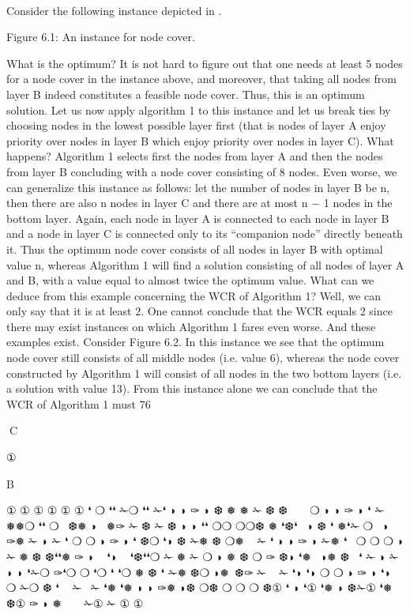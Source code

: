 \paragraph{}
Consider the following instance depicted in .

Figure 6.1: An instance for node cover.

What is the optimum? It is not hard to figure out that one needs at least 5 nodes for a node cover in
the instance above, and moreover, that taking all nodes from layer B indeed constitutes a feasible node
cover. Thus, this is an optimum solution. Let us now apply algorithm 1 to this instance and let us break
ties by choosing nodes in the lowest possible layer first (that is nodes of layer A enjoy priority over nodes
in layer B which enjoy priority over nodes in layer C). What happens? Algorithm 1 selects first the nodes
from layer A and then the nodes from layer B concluding with a node cover consisting of 8 nodes. Even
worse, we can generalize this instance as follows: let the number of nodes in layer B be n, then there
are also n nodes in layer C and there are at most n − 1 nodes in the bottom layer. Again, each node in
layer A is connected to each node in layer B and a node in layer C is connected only to its “companion
node” directly beneath it. Thus the optimum node cover consists of all nodes in layer B with optimal
value n, whereas Algorithm 1 will find a solution consisting of all nodes of layer A and B, with a value
equal to almost twice the optimum value. What can we deduce from this example concerning the WCR
of Algorithm 1? Well, we can only say that it is at least 2. One cannot conclude that the WCR equals 2
since there may exist instances on which Algorithm 1 fares even worse.
And these examples exist. Consider Figure 6.2.
In this instance we see that the optimum node cover still consists of all middle nodes (i.e. value 6),
whereas the node cover constructed by Algorithm 1 will consist of all nodes in the two bottom layers (i.e.
a solution with value 13). From this instance alone we can conclude that the WCR of Algorithm 1 must
76

C

①

B

①
①
①
①
①
①
❛
❍
❛❛ ✁❍
❛❛ ✁❛
◗
◗
✑
◗
❆
❅
❅
✁
❆
❆
 
 
❍
◗
◗
✑
◗ ❛ ✁ ❅❅❍
❛❛
❍  ❆❅ ◗  ❅✑ ✁ ❆
✁ ❆ ◗
◗ ❛❛ ❍❍
❍❍❆ ❅
❛❆❛  ◗
❆
❛
❅❛✁ ❍
 ◗ ✑❅ ✁
◗
✁
❛
❍
❍
◗
✑
◗
❛ ❆❍ ❛◗
❆
✁❅
❆ ❍❅
 
✁
❛
◗
◗
✑
◗ ✁❅ ❛ 
❍
❍
❍ ◗
✁ ❅ ❆
❆❛❛❅
✑
◗
  ❛◗
  ❛❆❛❛❍
✁ ❅
✁
❍ ◗ ❅ ❆
❍
✑ ❆◗ ❛❅
 ◗❅ ❆  ❛
✁ ◗
✁
◗
◗ ❛✁❍
✑❛❍
❍
❛❍
❛
❛❍
❅ ❆
❛
✁❅
❆❍
◗❅ ❆✑
✁  
✁
❛◗
❛◗
❍
❍
◗
✑
◗
❛◗
❍
✁❍
❆ ❛
 
✁ 
✁
❛❅
❛❅
◗
◗
✑❅
◗❆
❍❆
❍
❍
❍
❆①
❛
◗
❛① ❛❅
◗
❆✁① ❛❅
❆①
✑
◗
❅
 
 
✁①
✁
①
①

